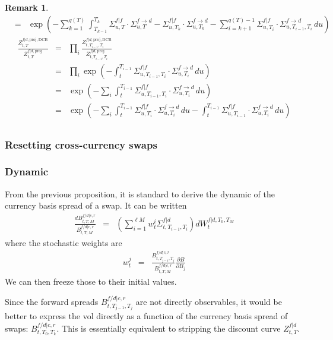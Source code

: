 \documentclass[11pt,english]{amsart}
\newcommand{\DCB}{\mathrm{DCB}}
\newcommand{\f}{\ell}
\theoremstyle{definition}
\newtheorem{rema}{Remark}
\begin{document}
\begin{rema}
\begin{eqnarray*}
  &=&  \exp\left( - \sum_{k=1}^{q(T)} \int_{T_{k-1}}^{T_{k}} \Sigma^{f|f}_{u,T} \cdot \Sigma^{f\to d}_{u,T} - \Sigma^{f|f}_{u,T_k} \cdot \Sigma^{f\to d}_{u,T_k} - \sum_{i=k+1}^{q(T)-1}  \Sigma^{f|f}_{u,T_i} \cdot \Sigma^{f\to d}_{u,T_{i-1},T_i} \, du \right)   
\end{eqnarray*} 
\begin{eqnarray*}
  \frac{Z^{f|d,\mathrm{proj},\DCB}_{t,T}}{Z^{f|d,\mathrm{proj}}_{t,T}} 
  &=& \prod_i \frac{Z^{f|d,\mathrm{proj},\DCB}_{t,T_{i-1},T_i}}{Z^{f|d,\mathrm{proj}}_{t,T_{i-1},T_i}}  \\
  &=& \prod_i  \exp\left( -\int_t^{T_{i-1}} \Sigma^{f|f}_{u,T_{i-1},T_i} \cdot \Sigma^{f\to d}_{u,T_i}\, du \right)   \\
  &=&  \exp\left( - \sum_i \int_t^{T_{i-1}} \Sigma^{f|f}_{u,T_{i-1},T_i} \cdot \Sigma^{f\to d}_{u,T_i}\, du \right)   \\
  &=& \exp\left( - \sum_i \int_t^{T_{i-1}} \Sigma^{f|f}_{u,T_i} \cdot \Sigma^{f\to d}_{u,T_i}\, du - \int_t^{T_{i-1}} \Sigma^{f|f}_{u,T_{i-1}} \cdot \Sigma^{f\to d}_{u,T_i}\, du \right)   \\
 \end{eqnarray*} 

\end{rema}




\newpage%
\subsubsection{Resetting cross-currency swaps}


\subsubsection{Dynamic}
From the previous proposition, it is standard to derive the dynamic of the currency basis spread of a swap. It can be written
\begin{eqnarray}
	\frac{dB^{f/d|c,r}_{t,T;M}}{B^{f/d|c,r}_{t,T;M}}  & = &  \left( \sum_{i=1}^{\f M} w^i_t \Sigma^{f|d}_{t,T_{i-1},T_i} \right)  dW^{f|d,T_0,T_M}_t
\end{eqnarray} 
where the stochastic weights are 
\begin{eqnarray}
	w^j_t &=& \frac{B^{f/d|c,r}_{t,T_{j-1},T_j}}{B^{f/d|c,r}_{t,T;M}} \frac{\partial B}{\partial B_j} 
\end{eqnarray} 
We can then freeze those to their initial values.

Since the forward spreads $B^{f/d|c,r}_{t,T_{j-1},T_j}$ are not directly observables, it would be better to express the vol directly as a function of the currency basis spread of swaps: $B^{f/d|c,r}_{t,T_{0},T_k}$. 
This is essentially equivalent to stripping the discount curve $Z^{f|d}_{t,T}$.
\end{document}
